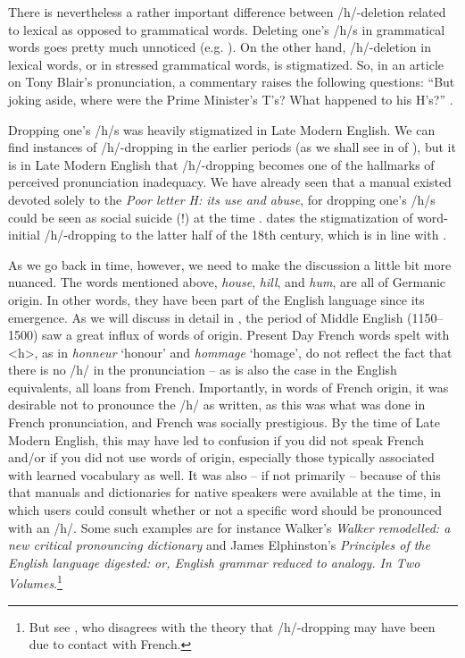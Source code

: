 There is nevertheless a rather important difference between /h/-deletion related to lexical as opposed to grammatical words. Deleting one's /h/s in grammatical words goes pretty much unnoticed (e.g. \citealp[56]{Barber1964}). On the other hand, /h/-deletion in lexical words, or in stressed grammatical words, is stigmatized. So, in an article on Tony Blair's pronunciation, a commentary raises the following questions: ``But joking aside, where were the Prime Minister's T's? What happened to his H's?'' \citep{Lyall1998}.

\largerpage
Dropping one's /h/s was heavily stigmatized in Late Modern English. We can find instances of /h/-dropping in the earlier periods (as we shall see in  of ), but it is in Late Modern English that /h/-dropping becomes one of the hallmarks of perceived pronunciation inadequacy. We have already seen that a manual existed devoted solely to the \textit{Poor letter H: its use and abuse}, for dropping one's /h/s could be seen as social suicide (!) at the time \citep[4]{Mugglestone2003}. \citet[159]{Beal2004} dates the stigmatization of word-initial /h/-dropping to the latter half of the 18th century, which is in line with \citet[81]{Strang1970}.

As we go back in time, however, we need to make the discussion a little bit more nuanced. The words mentioned above, \textit{house}, \textit{hill}, and \textit{hum}, are all of Germanic origin. In other words, they have been part of the English language since its emergence. As we will discuss in detail in , the period of Middle English (1150--1500) saw a great influx of words of  origin. Present Day French words spelt with <h>, as in \textit{honneur} `honour' and \textit{hommage} `homage', do not reflect the fact that there is no /h/ in the pronunciation -- as is also the case in the English equivalents, all loans from French. Importantly, in words of French origin, it was desirable not to pronounce the /h/ as written, as this was what was done in French pronunciation, and French was socially prestigious. By the time of Late Modern English, this may have led to confusion if you did not speak French and/or if you did not use words of  origin, especially those typically associated with learned vocabulary as well. It was also -- if not primarily -- because of this that manuals and dictionaries for native speakers were available at the time, in which users could consult whether or not a specific word should be pronounced with an /h/. Some such examples are for instance Walker's \textit{Walker remodelled: a new critical pronouncing dictionary} and James Elphinston's \textit{Principles of the English language digested: or, English grammar reduced to analogy. In Two Volumes}.\footnote{But see \citet{Feddema2013}, who disagrees with the theory that /h/-dropping may have been due to contact with French.}

